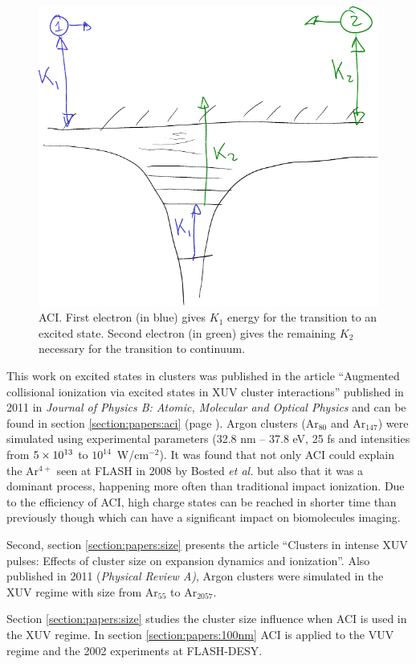 \begin{figure}
 \centering
 \includegraphics[width=0.38\columnwidth]{figures/mockups/ionization_aci}
 \caption{ACI. First electron (in blue) gives $K_1$ energy for the transition
          to an excited state. Second electron (in green) gives the remaining
          $K_2$ necessary for the transition to continuum.
}
 \label{fig:ionization:aci}
\end{figure}

This work on excited states in clusters was published in the article
``Augmented collisional ionization via excited states in XUV cluster
interactions'' published in 2011 in \textit{Journal of Physics B: Atomic,
Molecular and Optical Physics} and can be found in section
\ref{section:papers:aci} (page \pageref{section:papers:aci}). Argon clusters
(Ar$_{80}$ and Ar$_{147}$) were simulated using experimental parameters
(32.8 nm -- 37.8 eV, 25 fs and intensities from $\ten{5}{13}$ to
$10^{14}$~W/cm$^{-2}$). It was found that not only ACI could explain the
Ar$^{4+}$ seen at FLASH in 2008 by Bosted \textit{et al.} but also that it
was a dominant process, happening more often than traditional impact ionization.
Due to the efficiency of ACI, high charge states can be reached in shorter time
than previously though which can have a significant impact on biomolecules
imaging.



Second, section \ref{section:papers:size} presents the article ``Clusters in
intense XUV pulses: Effects of cluster size on expansion dynamics and
ionization''. Also published in 2011 (\textit{Physical Review A)}, Argon
clusters were simulated in the XUV regime with size from Ar$_{55}$ to
Ar$_{2057}$. 










Section \ref{section:papers:size} studies the cluster
size influence when ACI is used in the XUV regime. In section
\ref{section:papers:100nm} ACI is applied to the VUV regime and the
2002 experiments at FLASH-DESY.

